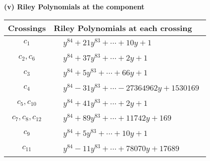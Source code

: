 \documentclass[1p]{elsarticle_modified}
\theoremstyle{definition}
\begin{document}
\newpage\renewcommand{\arraystretch}{1}
\flushleft \textbf{(v) Riley Polynomials at the component}\newline \\
\begin{tabular}{m{50pt}|m{274pt}}
Crossings & \hspace{64pt}Riley Polynomials at each crossing \\
\hline $$\begin{aligned}c_{1}\end{aligned}$$&$\begin{aligned}
&y^{84}+21 y^{83}+\cdots+10 y+1
\end{aligned}$\\
\hline $$\begin{aligned}c_{2},c_{6}\end{aligned}$$&$\begin{aligned}
&y^{84}+37 y^{83}+\cdots+2 y+1
\end{aligned}$\\
\hline $$\begin{aligned}c_{3}\end{aligned}$$&$\begin{aligned}
&y^{84}+5 y^{83}+\cdots+66 y+1
\end{aligned}$\\
\hline $$\begin{aligned}c_{4}\end{aligned}$$&$\begin{aligned}
&y^{84}-31 y^{83}+\cdots-27364962 y+1530169
\end{aligned}$\\
\hline $$\begin{aligned}c_{5},c_{10}\end{aligned}$$&$\begin{aligned}
&y^{84}+41 y^{83}+\cdots+2 y+1
\end{aligned}$\\
\hline $$\begin{aligned}c_{7},c_{8},c_{12}\end{aligned}$$&$\begin{aligned}
&y^{84}+89 y^{83}+\cdots+11742 y+169
\end{aligned}$\\
\hline $$\begin{aligned}c_{9}\end{aligned}$$&$\begin{aligned}
&y^{84}+5 y^{83}+\cdots+10 y+1
\end{aligned}$\\
\hline $$\begin{aligned}c_{11}\end{aligned}$$&$\begin{aligned}
&y^{84}-11 y^{83}+\cdots+78070 y+17689
\end{aligned}$\\
\hline
\end{tabular}\\~\\
\end{document}
